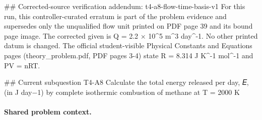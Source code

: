 \#\# Corrected-source verification addendum: t4-a8-flow-time-basis-v1
For this run, this controller-curated erratum is part of the problem evidence and supersedes only the unqualified flow unit printed on PDF page 39 and its bound page image. The corrected given is Q = 2.2 × 10\textasciicircum{}5 m\textasciicircum{}3 day\textasciicircum{}-1. No other printed datum is changed.
The official student-visible Physical Constants and Equations pages (theory\_problem.pdf, PDF pages 3-4) state R = 8.314 J K\textasciicircum{}-1 mol\textasciicircum{}-1 and PV = nRT.

\#\# Current subquestion T4-A8
Calculate the total energy released per day, 𝐸, (in J day−1) by complete isothermic combustion of methane at T = 2000 K

\paragraph{Shared problem context.}
